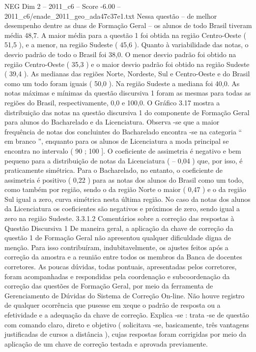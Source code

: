 \begin{textsample}{NEG Dim 2 – 2011\_c6 – Score -6.00 – 2011\_c6/enade\_2011\_geo\_ada47c37e1.txt}
Nessa questão – de melhor desempenho dentre as duas de Formação Geral – os alunos de todo Brasil tiveram média 48,7.
A maior média para a questão 1 foi obtida na região Centro-Oeste ( 51,5 ), e a menor, na região Sudeste ( 45,6 ).
Quanto à variabilidade das notas, o desvio padrão de todo o Brasil foi 38,0.
O menor desvio padrão foi obtido na região Centro-Oeste ( 35,3 ) e o maior desvio padrão foi obtido na região Sudeste ( 39,4 ).
As medianas das regiões Norte, Nordeste, Sul e Centro-Oeste e do Brasil como um todo foram iguais ( 50,0 ).
Na região Sudeste a mediana foi 40,0.
As notas máximas e mínimas da questão discursiva 1 foram as mesmas para todas as regiões do Brasil, respectivamente, 0,0 e 100,0.
O Gráfico 3.17 mostra a distribuição das notas na questão discursiva 1 do componente de Formação Geral para alunos do Bacharelado e da Licenciatura.
Observa -se que a maior frequência de notas dos concluintes do Bacharelado encontra -se na categoria “ em branco ”, enquanto para os alunos de Licenciatura a moda principal se encontra no intervalo ( 90 ; 100 ].
O coeficiente de assimetria é negativo e bem pequeno para a distribuição de notas da Licenciatura ( – 0,04 ) que, por isso, é praticamente simétrica.
Para o Bacharelado, no entanto, o coeficiente de assimetria é positivo ( 0,22 ) para as notas dos alunos do Brasil como um todo, como também por região, sendo o da região Norte o maior ( 0,47 ) e o da região Sul igual a zero, curva simétrica nesta última região.
No caso da notas dos alunos da Licenciatura os coeficientes são negativos e próximos de zero, sendo igual a zero na região Sudeste. 3.3.1.2 Comentários sobre a correção das respostas à Questão Discursiva 1 De maneira geral, a aplicação da chave de correção da questão 1 de Formação Geral não apresentou qualquer dificuldade digna de menção.
Para isso contribuíram, indubitavelmente, os ajustes feitos após a correção da amostra e a reunião entre todos os membros da Banca de docentes corretores.
As poucas dúvidas, todas pontuais, apresentadas pelos corretores, foram acompanhadas e respondidas pela coordenação e subcoordenação da correção das questões de Formação Geral, por meio da ferramenta de Gerenciamento de Dúvidas do Sistema de Correção On-line.
Não houve registro de qualquer ocorrência que pusesse em xeque o padrão de resposta ou a efetividade e a adequação da chave de correção.
Explica -se : trata -se de questão com comando claro, direto e objetivo ( solicitava -se, basicamente, três vantagens justificadas de cursos a distância ), cujas respostas foram corrigidas por meio da aplicação de um chave de correção testada e aprovada previamente.

\end{textsample}
